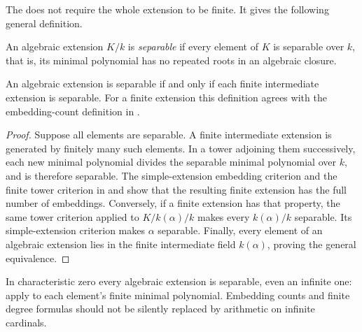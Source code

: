 The  does not require
the whole extension to be finite. It gives the following general definition.

\begin{definition}\label{separable-algebraic-extension}
An algebraic extension $K/k$ is \emph{separable} if every element of
$K$ is separable over $k$, that is, its minimal polynomial has no
repeated roots in an algebraic closure.
\end{definition}
\begin{proposition}\label{separable-finite-subextensions}
An algebraic extension is separable if and only if each finite
intermediate extension is separable. For a finite extension this
definition agrees with the embedding-count definition in
.
\end{proposition}
\begin{proof}\label{separable-finite-subextensions-proof}
Suppose all elements are separable. A finite intermediate extension
is generated by finitely many such elements. In a tower adjoining
them successively, each new minimal polynomial divides the separable
minimal polynomial over $k$, and is therefore separable.
The simple-extension embedding criterion and the finite tower
criterion in  and
 show that the resulting finite
extension has the full number of embeddings.
Conversely, if a finite extension has that property, the same tower
criterion applied to $K/k(\alpha)/k$ makes every $k(\alpha)/k$
separable. Its simple-extension criterion makes $\alpha$ separable.
Finally, every element of an algebraic extension lies in the finite
intermediate field $k(\alpha)$, proving the general equivalence.
\end{proof}
\begin{remark}\label{separability-characteristic-zero}
In characteristic zero every algebraic extension is separable, even
an infinite one: apply  to each element's finite minimal polynomial.
Embedding counts and finite degree formulas should not be silently
replaced by arithmetic on infinite cardinals.
\end{remark}

